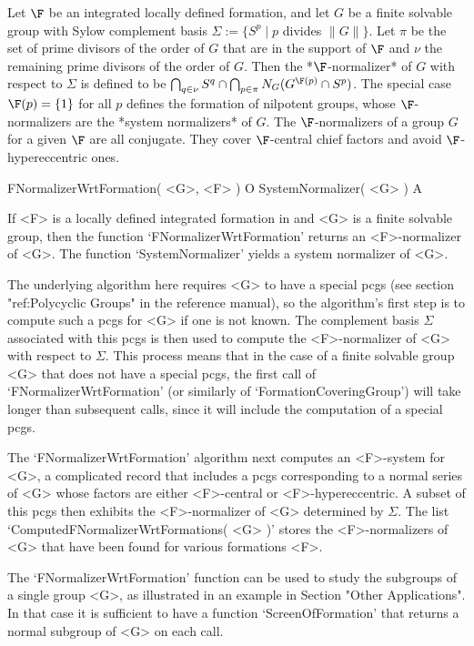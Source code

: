 


Let $\F$ be an integrated locally defined formation, and let $G$ be 
a finite solvable group with Sylow complement basis 
$\Sigma := 
\{ S^p \mid p$ divides  $ \|G\| \}$. 
Let $\pi$ be the set of prime
divisors of the order of $G$ that are in the support of $\F$ and 
${\nu}$ the remaining prime divisors of the order  of $G$. 
Then the *$\F$-normalizer* of $G$ with respect to $\Sigma$ is defined 
to be
$\bigcap_{q \in \nu} S^q \cap 
 \bigcap_{p \in \pi} N_G( G^{\F(p)} \cap S^p )$. 
The special case $\F(p) = \{ 1 \}$ for all $p$ defines the formation 
of nilpotent groups, whose $\F$-normalizers  
are the *system normalizers* of $G$. The $\F$-normalizers of a group 
$G$ for a given $\F$ are all conjugate. They cover $\F$-central chief 
factors and avoid $\F$-hypereccentric ones.

\> FNormalizerWrtFormation( <G>, <F> ) O
\> SystemNormalizer( <G> ) A

If <F> is a locally defined integrated formation in {\GAP} and 
<G> is a finite solvable group, then the function `FNormalizerWrtFormation'
returns an <F>-normalizer of <G>. The function `SystemNormalizer' yields a 
system normalizer of <G>.

The underlying algorithm here requires <G> to have a special pcgs (see section "ref:Polycyclic Groups" in the {\GAP} reference manual), so the algorithm's first step is
 to compute such a pcgs for <G> if one is not known. The complement basis
$\Sigma$ associated with this pcgs is then used to compute the
<F>-normalizer of <G> with respect to $\Sigma$. This process means that 
in the case of a finite solvable group <G> that does not have a special pcgs, 
the first call of `FNormalizerWrtFormation' (or similarly of `FormationCoveringGroup') 
will  take longer than subsequent calls, since it will include the
computation  of a special pcgs.

The `FNormalizerWrtFormation' algorithm next computes an <F>-system for <G>, a
complicated record that includes a pcgs corresponding to a normal series 
of <G> whose factors are either <F>-central or <F>-hypereccentric. A subset 
of this pcgs then exhibits the <F>-normalizer of <G> determined by
$\Sigma$. The list `ComputedFNormalizerWrtFormations( <G> )' stores the <F>-normalizers
of <G> that have been found for various formations <F>.  

The `FNormalizerWrtFormation' function can be used to study the subgroups of a 
single group <G>, as illustrated in an example in Section "Other Applications". In that case it is sufficient to have a function
`ScreenOfFormation' that  returns a normal subgroup of <G> on each call.

